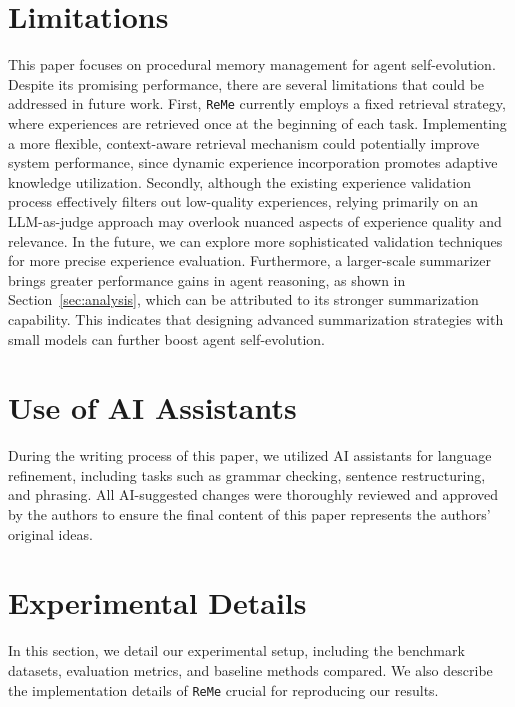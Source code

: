 \documentclass[11pt]{article}
\newcommand{\ours}{\texttt{ReMe}}
\begin{document}
\section*{Limitations}

This paper focuses on procedural memory management for agent self-evolution. 
Despite its promising performance, there are several limitations that could be addressed in future work. 
First, {\ours} currently employs a fixed retrieval strategy, where experiences are retrieved once at the beginning of each task. 
Implementing a more flexible, context-aware retrieval mechanism could potentially improve system performance, since dynamic experience incorporation promotes adaptive knowledge utilization.
Secondly, although the existing experience validation process effectively filters out low-quality experiences, relying primarily on an LLM-as-judge approach may overlook nuanced aspects of experience quality and relevance. 
In the future, we can explore more sophisticated validation techniques for more precise experience evaluation. 
Furthermore, a larger-scale summarizer brings greater performance gains in agent reasoning, as shown in Section~\ref{sec:analysis}, which can be attributed to its stronger summarization capability. 
This indicates that designing advanced summarization strategies with small models can further boost agent self-evolution.



%


\appendix
\section{Use of AI Assistants}
During the writing process of this paper, we utilized AI assistants for language refinement, including tasks such as grammar checking, sentence restructuring, and phrasing. 
All AI-suggested changes were thoroughly reviewed and approved by the authors to ensure the final content of this paper represents the authors' original ideas. 

\section{Experimental Details}
In this section, we detail our experimental setup, including the benchmark datasets, evaluation metrics, and baseline methods compared. We also describe the implementation details of {\ours} crucial for reproducing our results.
\end{document}
